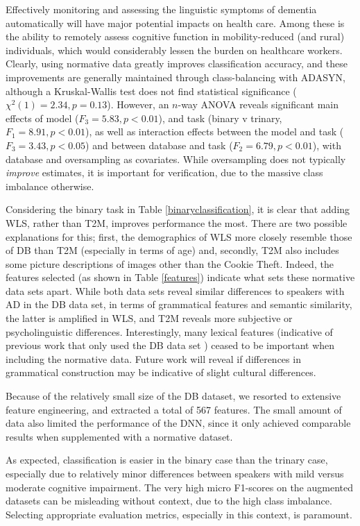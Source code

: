 \documentclass{article}
\begin{document}
Effectively monitoring and assessing the linguistic symptoms of dementia automatically will have major potential impacts on health care. Among these is the ability to remotely assess cognitive function in mobility-reduced (and rural) individuals, which would considerably lessen the burden on healthcare workers. Clearly, using normative data greatly improves classification accuracy, and these improvements are generally maintained through class-balancing with ADASYN, although a Kruskal-Wallis test does not find statistical significance ($\chi^2(1)=2.34, p=0.13$). However, an $n$-way ANOVA reveals significant main effects of model ($F_3 = 5.83, p<0.01$), and task (binary v trinary, $F_1 = 8.91, p<0.01$), as well as interaction effects between the model and task ($F_3=3.43,p<0.05$) and between database and task ($F_2=6.79, p<0.01$), with database and oversampling as covariates. While oversampling does not typically {\em improve} estimates, it is important for verification, due to the massive class imbalance otherwise.

Considering the binary task in Table \ref{binaryclassification}, it is clear that adding WLS, rather than T2M, improves performance the most. There are two possible explanations for this; first, the demographics of WLS more closely resemble those of DB than T2M (especially in terms of age) and, secondly, T2M also includes some picture descriptions of images other than the Cookie Theft. Indeed, the features selected (as shown in Table \ref{features}) indicate what sets these normative data sets apart. While both data sets reveal similar differences to speakers with AD in the DB data set, in terms of grammatical features and semantic similarity, the latter is amplified in WLS, and T2M reveals more subjective or psycholinguistic differences. Interestingly, many lexical features (indicative of previous work that only used the DB data set \cite{Fraser2015}) ceased to be important when including the normative data. Future work will reveal if differences in grammatical construction may be indicative of slight cultural differences.

Because of the relatively small size of the DB dataset, we resorted to extensive feature engineering, and extracted a total of 567 features. The small amount of data also limited the performance of the DNN, since it only achieved comparable results when supplemented with a normative dataset. 

As expected, classification is easier in the binary case than the trinary case, especially due to relatively minor differences between speakers with mild versus moderate cognitive impairment. The very high micro F1-scores on the augmented datasets can be misleading without context, due to the high class imbalance. Selecting appropriate evaluation metrics, especially in this context, is paramount.
\end{document}
